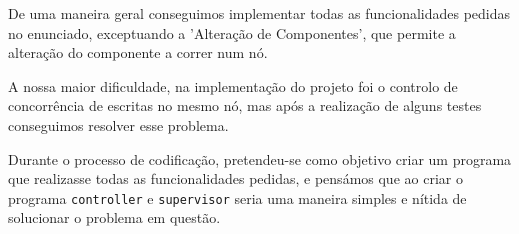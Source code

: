 \documentclass[12pt]{article}
\begin{document}
De uma maneira geral conseguimos implementar todas as funcionalidades pedidas no enunciado, exceptuando a 'Alteração de Componentes', que permite a alteração do componente a correr num nó. 

A nossa maior dificuldade, na implementação do projeto foi o controlo de concorrência de escritas no mesmo nó, mas após a realização de alguns testes conseguimos resolver esse problema.

Durante o processo de codificação, pretendeu-se como objetivo criar um programa que realizasse todas as funcionalidades pedidas, e pensámos que ao criar o programa \texttt{controller} e \texttt{supervisor} seria uma maneira simples e nítida de solucionar o problema em questão.


\end{document}
